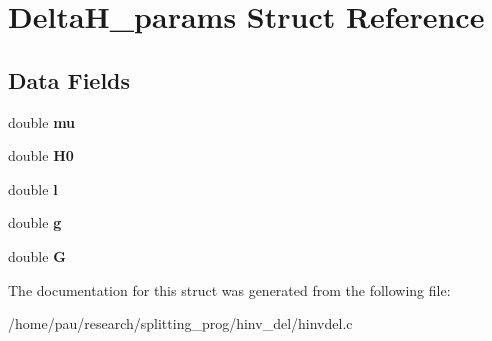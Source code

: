 \hypertarget{struct_delta_h__params}{
\section{DeltaH\_\-params Struct Reference}
\label{struct_delta_h__params}
}
\subsection*{Data Fields}
\begin{DoxyCompactItemize}
\item 
\hypertarget{struct_delta_h__params_a74577585cf12d1712ab9c57616d49205}{
double {\bfseries mu}}
\label{struct_delta_h__params_a74577585cf12d1712ab9c57616d49205}

\item 
\hypertarget{struct_delta_h__params_a829cbfb68d64295f7122d0fd0dc58448}{
double {\bfseries H0}}
\label{struct_delta_h__params_a829cbfb68d64295f7122d0fd0dc58448}

\item 
\hypertarget{struct_delta_h__params_a59e80b8ba32c12c6d0a868f17a19ae48}{
double {\bfseries l}}
\label{struct_delta_h__params_a59e80b8ba32c12c6d0a868f17a19ae48}

\item 
\hypertarget{struct_delta_h__params_ab30c765b9be1b7776c97c899a12a66bb}{
double {\bfseries g}}
\label{struct_delta_h__params_ab30c765b9be1b7776c97c899a12a66bb}

\item 
\hypertarget{struct_delta_h__params_a67783a2c4f670ee5a9dadcf428324d32}{
double {\bfseries G}}
\label{struct_delta_h__params_a67783a2c4f670ee5a9dadcf428324d32}

\end{DoxyCompactItemize}


The documentation for this struct was generated from the following file:\begin{DoxyCompactItemize}
\item 
/home/pau/research/splitting\_\-prog/hinv\_\-del/hinvdel.c\end{DoxyCompactItemize}
